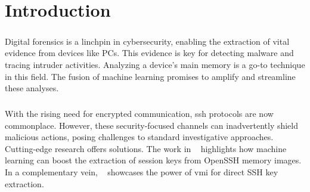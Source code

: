 \chapter{Introduction}\label{chap:introduction}


\begin{comment}
Motivate your research and outline the research gap in this chapter. Why is your thesis relevant and what do you address, what has not been addressed before. 

General Requirements to the thesis:

\begin{itemize}
	\item 60 pages of content in this format. Content does not include table of content, lists, appendices etc.
	\item Proper scientific referencing
	\item Introduction and Background should be less than 50\% of the thesis
	\item Images should be readable and in the proper size. 
\end{itemize}
\end{comment}


\paragraph*{}Digital forensics is a linchpin in cybersecurity, enabling the extraction of vital evidence from devices like PCs. This evidence is key for detecting malware and tracing intruder activities. Analyzing a device's main memory is a go-to technique in this field. The fusion of machine learning promises to amplify and streamline these analyses.
 
\paragraph*{}With the rising need for encrypted communication, \acrfull{ssh} protocols are now commonplace. However, these security-focused channels can inadvertently shield malicious actions, posing challenges to standard investigative approaches. Cutting-edge research offers solutions. The work in ~\cite*{fellicious_smartkex_2022} highlights how machine learning can boost the extraction of session keys from OpenSSH memory images. In a complementary vein, ~\cite*{sentanoe_sshkex_2022} showcases the power of \acrfull{vmi} for direct SSH key extraction.

